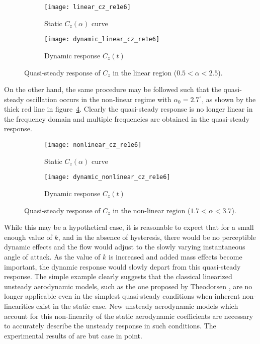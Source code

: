 \begin{figure}[h]
	\centering
	\begin{subfigure}[b]{0.45\textwidth}
		\centering
		\texttt{[image: linear\_cz\_re1e6]}
		\caption{Static $C_{z}(\alpha)$ curve}
		\label{fig:static_linear}
	\end{subfigure}
	\begin{subfigure}[b]{0.45\textwidth}
		\centering
		\texttt{[image: dynamic\_linear\_cz\_re1e6]}
		\caption{Dynamic response $C_{z}(t)$}
		\label{fig:dynamic_linear}
	\end{subfigure}
	\caption{Quasi-steady response of $C_{z}$ in the linear region ($0.5<\alpha<2.5$).}
	\label{fig:linear_cz_response}
\end{figure}
On the other hand, the same procedure may be followed such that the quasi-steady oscillation occurs in the non-linear regime with $\alpha_{0}=2.7^{\circ}$, as shown by the thick red line in figure~\ref{fig:static_nonlinear}. Clearly the quasi-steady response is no longer linear in the frequency domain and multiple frequencies are obtained in the quasi-steady response.
\begin{figure}[h]
	\centering
	\begin{subfigure}[b]{0.45\textwidth}
		\centering
		\texttt{[image: nonlinear\_cz\_re1e6]}
		\caption{Static $C_{z}(\alpha)$ curve}
		\label{fig:static_nonlinear}
	\end{subfigure}
	\begin{subfigure}[b]{0.45\textwidth}
		\centering
		\texttt{[image: dynamic\_nonlinear\_cz\_re1e6]}
		\caption{Dynamic response $C_{z}(t)$}
		\label{fig:dynamic_nonlinear}
	\end{subfigure}
	\caption{Quasi-steady response of $C_{z}$ in the non-linear region ($1.7<\alpha<3.7$).}
	\label{fig:nonlinear_cz_response}
\end{figure}
While this may be a hypothetical case, it is reasonable to expect that for a small enough value of $k$, and in the absence of hysteresis, there would be no perceptible dynamic effects and the flow would adjust to the slowly varying instantaneous angle of attack. As the value of $k$ is increased and added mass effects become important, the dynamic response would slowly depart from this quasi-steady response. The simple example clearly suggests that the classical linearized unsteady aerodynamic models, such as the one proposed by Theodorsen \citep{theodorsen35}, are no longer applicable even in the simplest quasi-steady conditions when inherent non-linearities exist in the static case. New unsteady aerodynamic models which account for this non-linearity of the static aerodynamic coefficients are necessary to accurately describe the unsteady response in such conditions. The experimental results of \cite{mai11,hebler13,lokattthesis} are but case in point. 

